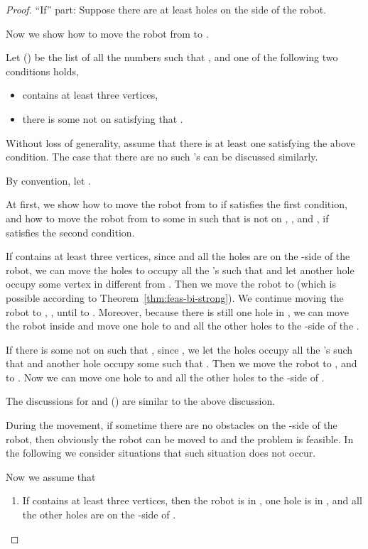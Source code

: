 \documentclass{article}
\begin{document}
\begin{proof}
``If'' part: Suppose there are at least  holes on the  side
of the robot.

Now we show how to move the robot from  to .

Let  () be the list of all the
numbers  such that , and one of the following
two conditions holds,
\begin{itemize}
\item  contains at least three vertices,

\item there is some  not on  satisfying that .
\end{itemize}

Without loss of generality, assume that there is at least one 
satisfying the above condition. The case that there are no such
's can be discussed similarly.

By convention, let .

At first, we show how to move the robot from  to 
if  satisfies the first condition, and how to move the robot
from  to some  in  such that  is not on ,
, and , if 
satisfies the second condition.

If  contains at least three vertices, since  and
all the holes are on the -side of the robot, we can move the
holes to occupy all the 's such that  and let
another hole occupy some vertex in  different from
. Then we move the robot to  (which is possible
according to Theorem~\ref{thm:feas-bi-strong}). We continue moving
the robot to , , until to . Moreover, because
there is still one hole in , we can move the robot inside
 and move one hole to  and all the other holes
to the -side of the .

If there is some  not on  such that , since , we let the holes occupy all the 's
such that  and another hole occupy some  such that . Then we move the robot to
, and to . Now we can move one hole to  and all
the other holes to the -side of .

The discussions for  and  () are similar
to the above discussion.

During the movement, if sometime there are no obstacles on the
-side of the robot, then obviously the robot can be moved to 
and the problem is feasible. In the following we consider situations
that such situation does not occur.

Now we assume that
\begin{enumerate}
\item If  contains at least three vertices, then the robot is in , one hole
is in , and all the other holes are on the -side of
.


\end{enumerate}
\end{proof}
\end{document}
